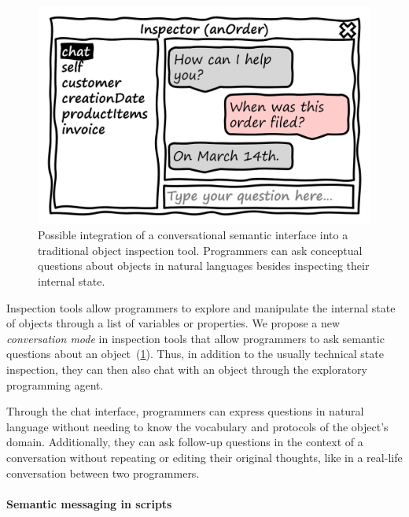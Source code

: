 \begin{figure}
	\centering
	\includegraphics[height=10\baselineskip]{03_agent/inspector.png}
	\caption[Possible integration of a conversational semantic interface into a traditional object inspection tool.]{
		Possible integration of a conversational semantic interface into a traditional object inspection tool.
		Programmers can ask conceptual questions about objects in natural languages besides inspecting their internal state.
	}
	\label{fig:design/agent/interfaces/inspector}
\end{figure}

Inspection tools allow programmers to explore and manipulate the internal state of objects through a list of variables or properties.
We propose a new \emph{conversation mode} in inspection tools that allow programmers to ask semantic questions about an object~(\cref{fig:design/agent/interfaces/inspector}).
Thus, in addition to the usually technical state inspection, they can then also chat with an object through the exploratory programming agent.

Through the chat interface, programmers can express questions in natural language without needing to know the vocabulary and protocols of the object's domain.
Additionally, they can ask follow-up questions in the context of a conversation without repeating or editing their original thoughts, like in a real-life conversation between two programmers.

\paragraph{Semantic messaging in scripts}
\label{par:design/agent/interfaces/messaging}

